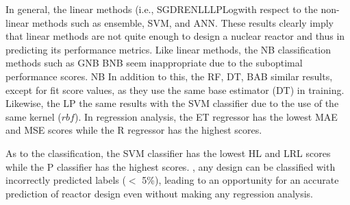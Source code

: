     In general, the linear methods (i.e., \DIFdelbegin {}\DIFdelend \DIFaddbegin \gls{SGD}\DIFadd{, }\gls{R}\DIFadd{, }\gls{EN}\DIFadd{, }\gls{L}\DIFadd{, }\gls{LL}\DIFadd{, }\gls{P}\gls{Log}\DIFaddend with respect to the non-linear methods such as ensemble, \gls{SVM}, and \gls{ANN}. These results clearly imply that \DIFdelbegin {}\DIFdelend linear methods are not quite enough to design a nuclear reactor and thus in predicting its performance metrics. Like \DIFdelbegin {}\DIFdelend linear methods, the \DIFdelbegin {}\DIFdelend \DIFaddbegin \gls{NB} \DIFaddend classification methods such as \DIFdelbegin {}\DIFdelend \DIFaddbegin \gls{GNB} \gls{BNB} \DIFaddend seem inappropriate due to the suboptimal performance scores. \DIFaddbegin {}\gls{NB} \DIFaddend In addition to this, the \gls{RF}, \gls{DT}, \DIFdelbegin {}\DIFdelend \DIFaddbegin \gls{B}\gls{AB} \DIFaddend similar results, except for fit score values, as they use the same base estimator (\DIFdelbegin {}\DIFdelend \DIFaddbegin \gls{DT}\DIFaddend ) in training. Likewise, the \DIFdelbegin {}\DIFdelend \DIFaddbegin \gls{LP} \DIFaddend the same results with the \DIFdelbegin %
\DIFdelend \DIFaddbegin \gls{SVM} \DIFaddend classifier due to the use of the same kernel ($rbf$). In \DIFdelbegin {}\DIFdelend regression analysis, the \gls{ET} regressor has the lowest \gls{MAE} and \gls{MSE} scores while the \DIFdelbegin {}\DIFdelend \DIFaddbegin \gls{R} \DIFaddend regressor has the highest scores.

    As to the classification, the \DIFdelbegin %
\DIFdelend \DIFaddbegin \gls{SVM} \DIFaddend classifier has the lowest \gls{HL} and \gls{LRL} scores while the \DIFdelbegin {}\DIFdelend \DIFaddbegin \gls{P} \DIFaddend classifier has the highest scores. \DIFdelbegin {}\DIFdelend \DIFaddbegin {}\DIFaddend , any design can be classified with \DIFdelbegin {}\DIFdelend \DIFaddbegin {}\DIFaddend incorrectly predicted labels (\DIFaddbegin {}\DIFaddend $<$ 5\%)\DIFdelbegin {}\DIFdelend , leading to an opportunity for an accurate prediction of reactor design even without making any regression analysis.

